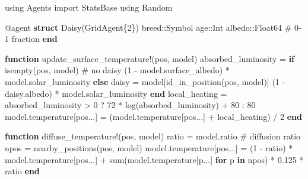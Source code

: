 \documentclass[
  english,
  russian,
  12pt,
  a4paper,
  DIV=11,
  numbers=noendperiod]{scrreprt}
\newenvironment{Shaded}{\begin{snugshade}}{\end{snugshade}}
\newcommand{\BuiltInTok}[1]{\textcolor[rgb]{0.00,0.23,0.31}{#1}}
\newcommand{\CommentTok}[1]{\textcolor[rgb]{0.37,0.37,0.37}{#1}}
\newcommand{\ControlFlowTok}[1]{\textcolor[rgb]{0.00,0.23,0.31}{\textbf{#1}}}
\newcommand{\DataTypeTok}[1]{\textcolor[rgb]{0.68,0.00,0.00}{#1}}
\newcommand{\FloatTok}[1]{\textcolor[rgb]{0.68,0.00,0.00}{#1}}
\newcommand{\FunctionTok}[1]{\textcolor[rgb]{0.28,0.35,0.67}{#1}}
\newcommand{\ImportTok}[1]{\textcolor[rgb]{0.00,0.46,0.62}{#1}}
\newcommand{\KeywordTok}[1]{\textcolor[rgb]{0.00,0.23,0.31}{\textbf{#1}}}
\newcommand{\NormalTok}[1]{\textcolor[rgb]{0.00,0.23,0.31}{#1}}
\newcommand{\OperatorTok}[1]{\textcolor[rgb]{0.37,0.37,0.37}{#1}}
\newcommand{\PreprocessorTok}[1]{\textcolor[rgb]{0.68,0.00,0.00}{#1}}
\begin{document}
\begin{Shaded}
\begin{Highlighting}[]
\ImportTok{using} \BuiltInTok{Agents}
\ImportTok{import} \BuiltInTok{StatsBase}
\ImportTok{using} \BuiltInTok{Random}

\PreprocessorTok{@agent} \KeywordTok{struct} \FunctionTok{Daisy}\NormalTok{(GridAgent\{}\FloatTok{2}\NormalTok{\})}
\NormalTok{    breed}\OperatorTok{::}\DataTypeTok{Symbol}
\NormalTok{    age}\OperatorTok{::}\DataTypeTok{Int}
\NormalTok{    albedo}\OperatorTok{::}\DataTypeTok{Float64 }\CommentTok{\# 0{-}1 fraction}
\KeywordTok{end}

\KeywordTok{function} \FunctionTok{update\_surface\_temperature!}\NormalTok{(pos, model)}
\NormalTok{    absorbed\_luminosity }\OperatorTok{=} \ControlFlowTok{if} \FunctionTok{isempty}\NormalTok{(pos, model) }\CommentTok{\# no daisy}
\NormalTok{        (}\FloatTok{1} \OperatorTok{{-}}\NormalTok{ model.surface\_albedo) }\OperatorTok{*}\NormalTok{ model.solar\_luminosity}
    \ControlFlowTok{else}
\NormalTok{        daisy }\OperatorTok{=}\NormalTok{ model[}\FunctionTok{id\_in\_position}\NormalTok{(pos, model)]}
\NormalTok{        (}\FloatTok{1} \OperatorTok{{-}}\NormalTok{ daisy.albedo) }\OperatorTok{*}\NormalTok{ model.solar\_luminosity}
    \ControlFlowTok{end}
\NormalTok{    local\_heating }\OperatorTok{=}\NormalTok{ absorbed\_luminosity }\OperatorTok{\textgreater{}} \FloatTok{0}\NormalTok{ ? }\FloatTok{72} \OperatorTok{*} \FunctionTok{log}\NormalTok{(absorbed\_luminosity) }\OperatorTok{+} \FloatTok{80} \OperatorTok{:} \FloatTok{80}
\NormalTok{    model.temperature[pos}\OperatorTok{...}\NormalTok{] }\OperatorTok{=}\NormalTok{ (model.temperature[pos}\OperatorTok{...}\NormalTok{] }\OperatorTok{+}\NormalTok{ local\_heating) }\OperatorTok{/} \FloatTok{2}
\KeywordTok{end}

\KeywordTok{function} \FunctionTok{diffuse\_temperature!}\NormalTok{(pos, model)}
\NormalTok{    ratio }\OperatorTok{=}\NormalTok{ model.ratio }\CommentTok{\# diffusion ratio}
\NormalTok{    npos }\OperatorTok{=} \FunctionTok{nearby\_positions}\NormalTok{(pos, model)}
\NormalTok{    model.temperature[pos}\OperatorTok{...}\NormalTok{] }\OperatorTok{=}
\NormalTok{        (}\FloatTok{1} \OperatorTok{{-}}\NormalTok{ ratio) }\OperatorTok{*}\NormalTok{ model.temperature[pos}\OperatorTok{...}\NormalTok{] }\OperatorTok{+}
        \FunctionTok{sum}\NormalTok{(model.temperature[p}\OperatorTok{...}\NormalTok{] }\ControlFlowTok{for}\NormalTok{ p }\KeywordTok{in}\NormalTok{ npos) }\OperatorTok{*} \FloatTok{0.125} \OperatorTok{*}\NormalTok{ ratio}
\ControlFlowTok{end}


\end{Highlighting}
\end{Shaded}
\end{document}
